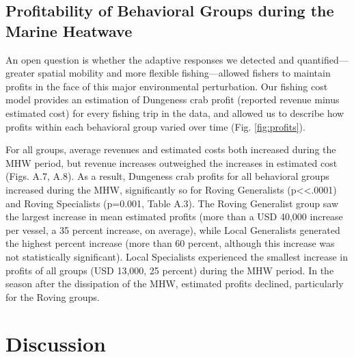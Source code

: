 \documentclass[]{elsarticle} %
\begin{document}
\hypertarget{profitability-of-behavioral-groups-during-the-marine-heatwave}{%
\subsection{Profitability of Behavioral Groups during the Marine
Heatwave}\label{profitability-of-behavioral-groups-during-the-marine-heatwave}}

An open question is whether the adaptive responses we detected and
quantified---greater spatial mobility and more flexible
fishing---allowed fishers to maintain profits in the face of this major
environmental perturbation. Our fishing cost model provides an
estimation of Dungeness crab profit (reported revenue minus estimated
cost) for every fishing trip in the data, and allowed us to describe how
profits within each behavioral group varied over time (Fig.
\ref{fig:profits}).

For all groups, average revenues and estimated costs both increased
during the MHW period, but revenue increases outweighed the increases in
estimated cost (Figs. A.7, A.8). As a result, Dungeness crab profits for
all behavioral groups increased during the MHW, significantly so for
Roving Generalists (p\textless\textless.0001) and Roving Specialists
(p=0.001, Table A.3). The Roving Generalist group saw the largest
increase in mean estimated profits (more than a USD 40,000 increase per
vessel, a 35 percent increase, on average), while Local Generalists
generated the highest percent increase (more than 60 percent, although
this increase was not statistically significant). Local Specialists
experienced the smallest increase in profits of all groups (USD 13,000,
25 percent) during the MHW period. In the season after the dissipation
of the MHW, estimated profits declined, particularly for the Roving
groups.

\hypertarget{discussion}{%
\section{Discussion}\label{discussion}}
\end{document}
